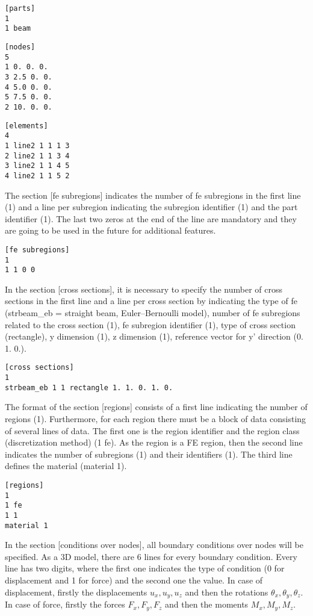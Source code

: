 \documentclass[a4]{article}
\begin{document}
\begin{Verbatim}	
[parts]
1
1 beam
\end{Verbatim}

\begin{Verbatim}	
[nodes]
5
1 0. 0. 0.
3 2.5 0. 0.
4 5.0 0. 0.
5 7.5 0. 0.
2 10. 0. 0.
\end{Verbatim}

\begin{Verbatim}	
[elements]
4
1 line2 1 1 1 3
2 line2 1 1 3 4
3 line2 1 1 4 5
4 line2 1 1 5 2
\end{Verbatim}

The section [fe subregions] indicates the number of fe subregions in the first line (1) and a line per subregion indicating the subregion identifier (1) and the part identifier (1). The last two zeros at the end of the line are mandatory and they are going to be used in the
future for additional features.

\begin{Verbatim}
[fe subregions]
1
1 1 0 0
\end{Verbatim}

In the section [cross sections], it is necessary to specify the number of cross sections in the first line and a line per cross section by indicating the type of fe (strbeam\_eb = straight beam, Euler–Bernoulli model), number of fe subregions related to the cross section (1), fe subregion identifier (1), type of cross section (rectangle), y dimension (1), z dimension (1), reference vector for y' direction (0. 1. 0.).

\begin{Verbatim}
[cross sections]
1
strbeam_eb 1 1 rectangle 1. 1. 0. 1. 0.
\end{Verbatim}

The format of the section [regions] consists of a first line indicating the number of regions (1). Furthermore, for each region there must be a block of data consisting of several lines of data. The first one is the region identifier and the region class (discretization method) (1 fe). As the region is a FE region, then the second line indicates the number of subregions (1) and their identifiers (1). The third line defines the material (material 1). 

\begin{Verbatim}	
[regions]
1
1 fe
1 1
material 1
\end{Verbatim}

In the section [conditions over nodes], all boundary conditions over nodes will be specified. As a 3D model, there are 6 lines for every boundary condition. Every line has two digits, where the first one indicates the type of condition (0 for displacement and 1 for force) and the second one the value. In case of displacement, firstly the displacements $u_x, u_y, u_z$ and then the rotations $\theta_x, \theta_y, \theta_z$. In case of force, firstly the forces $F_x, F_y, F_z$ and then the moments $M_x, M_y, M_z$. 
\end{document}
